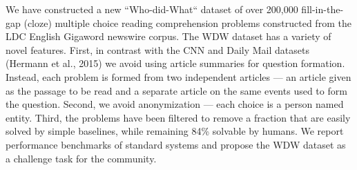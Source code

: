 We have constructed a new ``Who-did-What`` dataset of over 200,000 fill-in-the-gap (cloze) multiple choice reading comprehension problems constructed from the LDC English Gigaword newswire corpus. The WDW dataset has a variety of novel features. First, in contrast with the CNN and Daily Mail datasets (Hermann et al., 2015) we avoid using article summaries for question formation. Instead, each problem is formed from two independent articles — an article given as the passage to be read and a separate article on the same events used to form the question. Second, we avoid anonymization — each choice is a person named entity. Third, the problems have been filtered to remove a fraction that are easily solved by simple baselines, while remaining 84\% solvable by humans. We report performance benchmarks of standard systems and propose the WDW dataset as a challenge task for the community.
